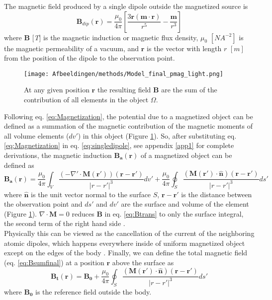 The magnetic field produced by a single dipole outside the magnetized source is \parencite{GRIFFITHS}
\begin{equation} \label{eq:singledipole}
{\mathbf {B}_{dip} ({\mathbf {r} })={\frac {\mu _{0}}{4\pi }}\left[{\frac {3\mathbf {r} (\mathbf {m} \cdot \mathbf {r} )}{r^{5}}}-{\frac {\mathbf {m} }{r^{3}}}\right]}
\end{equation}
where \textbf{B} [\textit{T}] is the magnetic induction or magnetic flux density,  $\mu_0$ $[NA^{-2}]$ is the magnetic permeability of a vacuum, and $\mathbf{r}$ is the vector with length $r$ $[m]$ from the position of the dipole to the observation point.
\begin{figure}
  \centering
   \texttt{[image: Afbeeldingen/methods/Model\_final\_pmag\_light.png]}
    \caption{At any given position $\mathbf{r}$ the resulting field $\mathbf{B}$ are the sum of the contribution of all elements in the object $\Omega$.}
    \label{fig:model_cells}
\end{figure}
Following eq. \ref{eq:Magnetization}, the potential due to a magnetized object can be defined as a summation of the magnetic contribution of the magnetic moments of all volume elements ($dv'$) in this object (Figure \ref{fig:model_cells}). So, after substituting eq. \ref{eq:Magnetization} in eq. \ref{eq:singledipole}, see appendix \ref{app1} for complete derivations, the magnetic induction $\mathbf{B_a(r)}$ of a magnetized object can be defined as \parencite{REITZ} 
\begin{equation}
 \label{eq:Btrans}
      \mathbf{B_a(r)} =  \frac{\mu_{0}}{4\pi}\int_V \frac{(-\nabla'\cdot\mathbf{M(r')})\mathbf{\left(r-r'\right)}}{\left|r-r'\right|^3}dv' 
     + \frac{\mu_{0}}{4\pi}\oint_S \frac{\left(\mathbf{M(r')}\cdot\mathbf{\hat{n}}\right)\mathbf{\left(r-r'\right)}}{\left|r-r'\right|^3}ds'
\end{equation}
 where $\mathbf{\hat{n}}$ is the unit vector normal to the surface $S$, $\mathbf{r-r'}$ is the distance between the observation point and $ds'$ and $dv'$ are the surface and volume of the element (Figure \ref{fig:model_cells}).
\newline
$\nabla \cdot \mathbf{M} = 0$ reduces $\mathbf{B}$ in  eq. \ref{eq:Btrans} to only the surface integral, the second term of the right hand side \parencite{GRIFFITHS,REITZ}.\\ Physically this can be viewed as the cancellation of the current of the neighboring atomic dipoles, which happens everywhere inside of uniform magnetized object except on the edges of the body \parencite{GRIFFITHS}.  
\newline 
Finally, we can define the total magnetic field (eq. \ref{eq:Bsumfinal}) at a position $\mathbf{r}$ above the surface as
\begin{equation}
    \label{eq:Bsumfinal}
   \mathbf{B_t(r)} =  \mathbf{B_0} + \frac{\mu_{0}}{4\pi}\oint_S \frac{\left(\mathbf{M(r')}\cdot\mathbf{\hat{n}}\right)\mathbf{\left(r-r'\right)}}{\left|r-r'\right|^3}ds'
\end{equation}
where $\mathbf{B_0} $ is the reference field outside the body. 

